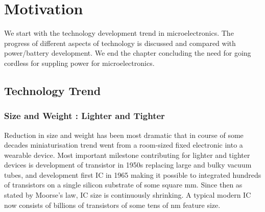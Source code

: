 \documentclass[12pt,a4paper,UKenglish]{report}
\begin{document}
\section{Motivation}

We start with the technology development trend in microelectronics. The progress of different aspects of 
technology is discussed and compared with power/battery development. We end the chapter concluding the need for
going cordless for suppling power for microelectronics.

\subsection{Technology Trend}

\subsubsection{Size and Weight : Lighter and Tighter}


Reduction in size and weight has been most dramatic that in course of some decades miniaturisation trend went 
from a room-sized fixed electronic into a wearable device. Most important milestone contributing for lighter and 
tighter devices is development of transistor in 1950s replacing large and bulky vacuum tubes, and  
development first IC in 1965 making it possible to integrated hundreds of transistors on a single silicon substrate of 
some square mm. Since then as stated by Moorse's law, IC size is continuously shrinking. A typical modern IC now 
consists of billions of transistors of some  tens of nm feature size. \\
\end{document}
